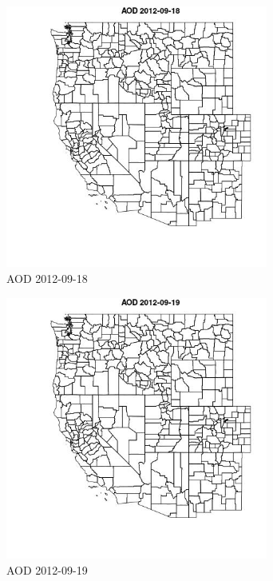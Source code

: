 \begin{figure} 
\centering  
\includegraphics[width=0.77\textwidth]{Code_Outputs/ML_input_report_ML_input_PM25_Step5_part_d_de_duplicated_aves_ML_input_MapObsAOD2012-09-18.jpg} 
\caption{\label{fig:ML_input_report_ML_input_PM25_Step5_part_d_de_duplicated_aves_ML_inputMapObsAOD2012-09-18}AOD 2012-09-18} 
\end{figure} 
 

\begin{figure} 
\centering  
\includegraphics[width=0.77\textwidth]{Code_Outputs/ML_input_report_ML_input_PM25_Step5_part_d_de_duplicated_aves_ML_input_MapObsAOD2012-09-19.jpg} 
\caption{\label{fig:ML_input_report_ML_input_PM25_Step5_part_d_de_duplicated_aves_ML_inputMapObsAOD2012-09-19}AOD 2012-09-19} 
\end{figure} 
 

